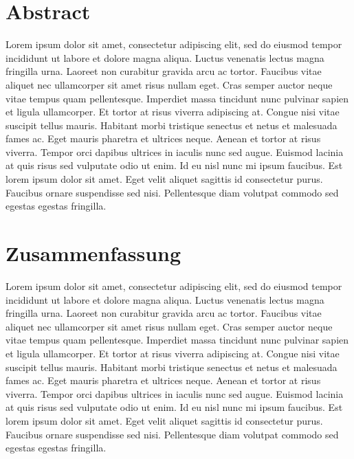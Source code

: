 \documentclass[
]{scrbook}
\begin{document}
\chapter{Abstract}\label{abstract}

Lorem ipsum dolor sit amet, consectetur adipiscing elit, sed do eiusmod tempor incididunt ut labore et dolore magna aliqua. Luctus venenatis lectus magna fringilla urna. Laoreet non curabitur gravida arcu ac tortor. Faucibus vitae aliquet nec ullamcorper sit amet risus nullam eget. Cras semper auctor neque vitae tempus quam pellentesque. Imperdiet massa tincidunt nunc pulvinar sapien et ligula ullamcorper. Et tortor at risus viverra adipiscing at. Congue nisi vitae suscipit tellus mauris. Habitant morbi tristique senectus et netus et malesuada fames ac. Eget mauris pharetra et ultrices neque. Aenean et tortor at risus viverra. Tempor orci dapibus ultrices in iaculis nunc sed augue. Euismod lacinia at quis risus sed vulputate odio ut enim. Id eu nisl nunc mi ipsum faucibus. Est lorem ipsum dolor sit amet. Eget velit aliquet sagittis id consectetur purus. Faucibus ornare suspendisse sed nisi. Pellentesque diam volutpat commodo sed egestas egestas fringilla.

\chapter{Zusammenfassung}\label{zusammenfassung}

Lorem ipsum dolor sit amet, consectetur adipiscing elit, sed do eiusmod tempor incididunt ut labore et dolore magna aliqua. Luctus venenatis lectus magna fringilla urna. Laoreet non curabitur gravida arcu ac tortor. Faucibus vitae aliquet nec ullamcorper sit amet risus nullam eget. Cras semper auctor neque vitae tempus quam pellentesque. Imperdiet massa tincidunt nunc pulvinar sapien et ligula ullamcorper. Et tortor at risus viverra adipiscing at. Congue nisi vitae suscipit tellus mauris. Habitant morbi tristique senectus et netus et malesuada fames ac. Eget mauris pharetra et ultrices neque. Aenean et tortor at risus viverra. Tempor orci dapibus ultrices in iaculis nunc sed augue. Euismod lacinia at quis risus sed vulputate odio ut enim. Id eu nisl nunc mi ipsum faucibus. Est lorem ipsum dolor sit amet. Eget velit aliquet sagittis id consectetur purus. Faucibus ornare suspendisse sed nisi. Pellentesque diam volutpat commodo sed egestas egestas fringilla.

\renewcommand{\baselinestretch}{1.2}\normalsize
\tableofcontents
\renewcommand{\baselinestretch}{1.5}\normalsize
\end{document}
